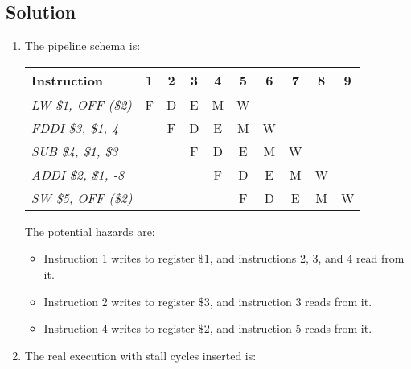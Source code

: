\subsection*{Solution}
\begin{enumerate}
    \item The pipeline schema is:
        \begin{table}[H]
            \centering
            \begin{tabular}{l|ccccccccc}
            \textbf{Instruction}        & \textbf{1} & \textbf{2} & \textbf{3} & \textbf{4} & \textbf{5} & \textbf{6} & \textbf{7} & \textbf{8} & \textbf{9}  \\ \hline
            \textit{LW \$1, OFF (\$2)}  & F          & D          & E          & M          & W          &            &            &            &            \\
            \textit{FDDI \$3, \$1, 4}   &            & F          & D          & E          & M          & W          &            &            &            \\
            \textit{SUB \$4, \$1, \$3}  &            &            & F          & D          & E          & M          & W          &            &            \\
            \textit{ADDI \$2, \$1, -8}  &            &            &            & F          & D          & E          & M          & W          &            \\
            \textit{SW \$5, OFF (\$2)}  &            &            &            &            & F          & D          & E          & M          & W         
            \end{tabular}
        \end{table}
        The potential hazards are:
        \begin{itemize}
            \item Instruction 1 writes to register $\$1$, and instructions 2, 3, and 4 read from it.
            \item Instruction 2 writes to register $\$3$, and instruction 3 reads from it.
            \item Instruction 4 writes to register $\$2$, and instruction 5 reads from it.
        \end{itemize}
    \item The real execution with stall cycles inserted is:
        \begin{table}[H]
            \centering
            \begin{tabular}{l|ccccccccccccccc}

\end{tabular}
\end{table}
\end{enumerate}
